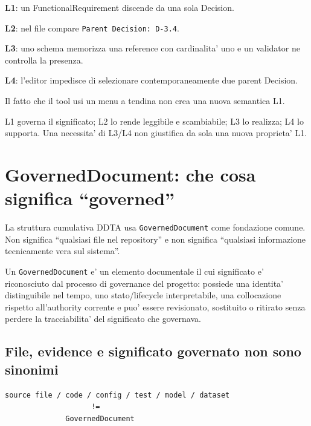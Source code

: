 \documentclass[11pt,a4paper]{article}
\begin{document}
\begin{ddtaexample}[title={Stesso concetto visto ai quattro livelli}]
\textbf{L1}: un FunctionalRequirement discende da una sola Decision.\par
\textbf{L2}: nel file compare \texttt{Parent Decision: D-3.4}.\par
\textbf{L3}: uno schema memorizza una reference con cardinalita' uno e un validator ne controlla la presenza.\par
\textbf{L4}: l'editor impedisce di selezionare contemporaneamente due parent Decision.\par
Il fatto che il tool usi un menu a tendina non crea una nuova semantica L1.
\end{ddtaexample}

\begin{ddtacore}[title={Regola di direzione}]
L1 governa il significato; L2 lo rende leggibile e scambiabile; L3 lo realizza; L4 lo supporta. Una necessita' di L3/L4 non giustifica da sola una nuova proprieta' L1.
\end{ddtacore}

\section{GovernedDocument: che cosa significa ``governed''}

La struttura cumulativa DDTA usa \texttt{GovernedDocument} come fondazione comune. Non significa ``qualsiasi file nel repository'' e non significa ``qualsiasi informazione tecnicamente vera sul sistema''.

\begin{ddtaprinciple}[title={Definizione operativa}]
Un \texttt{GovernedDocument} e' un elemento documentale il cui significato e' riconosciuto dal processo di governance del progetto: possiede una identita' distinguibile nel tempo, uno stato/lifecycle interpretabile, una collocazione rispetto all'authority corrente e puo' essere revisionato, sostituito o ritirato senza perdere la tracciabilita' del significato che governava.
\end{ddtaprinciple}

\subsection{File, evidence e significato governato non sono sinonimi}

\begin{lstlisting}
source file / code / config / test / model / dataset
                    !=
              GovernedDocument
\end{lstlisting}
\end{document}
